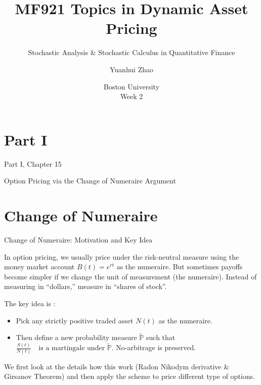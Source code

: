 \documentclass{beamer}
\title{MF921 Topics in Dynamic Asset Pricing}
\subtitle{Stochastic Analysis \& Stochastic Calculus in Quantitative Finance}
\author{Yuanhui Zhao}
\date{Boston University \\ \;\;Week 2}
\begin{document}
\frame{\titlepage}
\section{Part I}
\begin{frame}{Part I, Chapter 15}
    \begin{center}
    Option
    Pricing via the Change of
    Numeraire Argument
    \end{center}
\end{frame}
\section{Change of Numeraire}
\begin{frame}{Change of Numeraire: Motivation and Key Idea}
    \par In option pricing, we usually price under the risk-neutral measure using 
    the money market account $B(t) = e^{rt}$ as the numeraire. 
    But sometimes payoffs become simpler if we change the unit of measurement (the numeraire).
    Instead of measuring in “dollars,” measure in “shares of stock”.
    \vspace{1em}
    \par The key idea is :
    \begin{itemize}
        \item Pick any strictly positive traded asset $N(t)$ as the numeraire.
        \item Then define a new probability measure $\tilde{\mathbb{P}}$ such that 
        $\frac{S(t)}{N(t)} \quad \text{is a martingale under } \tilde{\mathbb{P}}.$ No-arbitrage is preserved.
    \end{itemize}
    \vspace{1em}
    \par We first look at the details how this work (Radon Nikodym derivative \& Girsanov Theorem) and 
    then apply the scheme to price different type of options. 
\end{frame}
\end{document}
